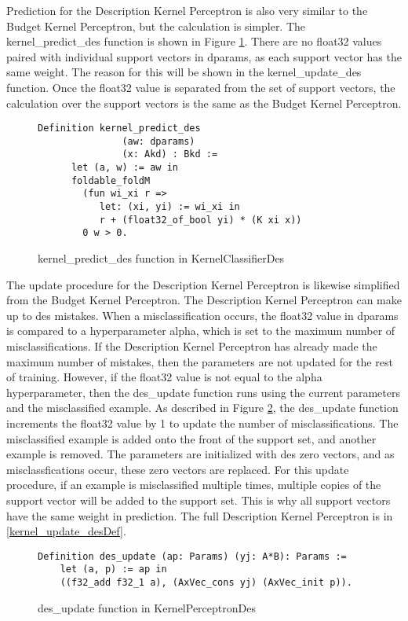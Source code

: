 Prediction for the Description Kernel Perceptron is also very similar to the Budget Kernel Perceptron, but the calculation is simpler. The kernel\_predict\_des function is shown in Figure \ref{kernel_predict_desDef}. There are no float32 values paired with individual support vectors in dparams, as each support vector has the same weight. The reason for this will be shown in the kernel\_update\_des function. Once the float32 value is separated from the set of support vectors, the calculation over the support vectors is the same as the Budget Kernel Perceptron.

\begin{figure}
    \caption{kernel\_predict\_des function in KernelClassifierDes}
    \label{kernel_predict_desDef}
    \begin{lstlisting}
Definition kernel_predict_des
               (aw: dparams)
               (x: Akd) : Bkd :=
      let (a, w) := aw in
      foldable_foldM
        (fun wi_xi r =>
           let: (xi, yi) := wi_xi in 
           r + (float32_of_bool yi) * (K xi x))
        0 w > 0.
    \end{lstlisting}
\end{figure}

The update procedure for the Description Kernel Perceptron is likewise simplified from the Budget Kernel Perceptron. The Description Kernel Perceptron can make up to des mistakes. When a misclassification occurs, the float32 value in dparams is compared to a hyperparameter alpha, which is set to the maximum number of misclassifications. If the Description Kernel Perceptron has already made the maximum number of mistakes, then the parameters are not updated for the rest of training. However, if the float32 value is not equal to the alpha hyperparameter, then the des\_update function runs using the current parameters and the misclassified example. As described in Figure \ref{des_updateDef}, the des\_update function increments the float32 value by 1 to update the number of misclassifications. The misclassified example is added onto the front of the support set, and another example is removed. The parameters are initialized with des zero vectors, and as misclassfications occur, these zero vectors are replaced. For this update procedure, if an example is misclassified multiple times, multiple copies of the support vector will be added to the support set. This is why all support vectors have the same weight in prediction. The full Description Kernel Perceptron is in \ref{kernel_update_desDef}.

\begin{figure}
    \caption{des\_update function in KernelPerceptronDes}
    \label{des_updateDef}
    \begin{lstlisting}
Definition des_update (ap: Params) (yj: A*B): Params :=      
    let (a, p) := ap in
    ((f32_add f32_1 a), (AxVec_cons yj) (AxVec_init p)).
    \end{lstlisting}
\end{figure}

